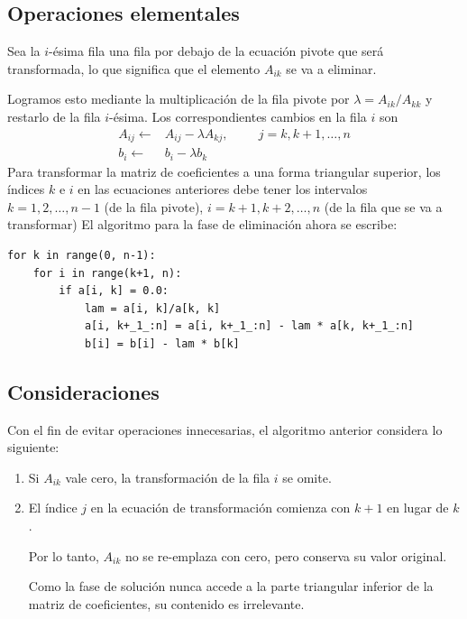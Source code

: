 \subsection*{Operaciones elementales}
Sea la $i$-ésima fila una fila por debajo de la ecuación pivote que será transformada, lo que significa que el elemento $A_{ik}$ se va a eliminar. 
\par
Logramos esto mediante la multiplicación de la fila pivote por $\lambda = A_{ik} / A_{kk}$ y restarlo de la fila $i$-ésima. Los correspondientes cambios en la fila $i$ son
\[ \begin{split}
A_{ij} \leftarrow& A_{ij} - \lambda A_{kj},  \hspace{1cm} j = k, k+1, \ldots,n \\
b_{i} \leftarrow& b_{i} - \lambda b_{k}
\end{split} \]
Para transformar la matriz de coeficientes a una forma triangular superior, los índices $k$ e $i$ en las ecuaciones anteriores debe tener los intervalos $k = 1, 2, \ldots,n-1$ (de la fila pivote), $i = k + 1, k + 2, \ldots,n$ (de la fila que se va a transformar)
El algoritmo para la fase de eliminación ahora se escribe:
\begin{lstlisting}[caption=Eliminación de Gauss, style=FormattedNumber, basicstyle=\linespread{1.1}\ttfamily=\small, columns=fullflexible]
for k in range(0, n-1):
    for i in range(k+1, n):
        if a[i, k] = 0.0:
            lam = a[i, k]/a[k, k]
            a[i, k+_1_:n] = a[i, k+_1_:n] - lam * a[k, k+_1_:n]
            b[i] = b[i] - lam * b[k]
\end{lstlisting}
\subsection*{Consideraciones}
Con el fin de evitar operaciones innecesarias, el algoritmo anterior considera lo siguiente:
\begin{enumerate}
\item Si $A_{ik}$ vale cero, la transformación de la fila $i$ se omite.
\item El índice $j$ en la ecuación de transformación comienza con $k + 1$ en lugar de $k$.
\par
Por lo tanto, $A_{ik}$ no se re-emplaza con cero, pero conserva su valor original.
\par
Como la fase de solución nunca accede a la parte triangular inferior de la matriz de coeficientes, su contenido es irrelevante.
\end{enumerate}
